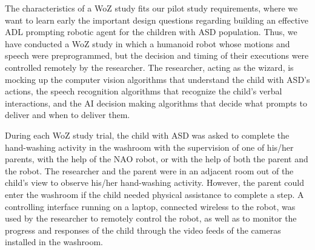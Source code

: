 \documentclass{ut-thesis}
\providecommand{\DIFaddtex}[1]{{\protect\color{blue}\uwave{#1}}} %
\providecommand{\DIFaddbegin}{} %
\providecommand{\DIFaddend}{} %
\providecommand{\DIFadd}[1]{\texorpdfstring{\DIFaddtex{#1}}{#1}} %
\begin{document}
The characteristics of a WoZ study fits our pilot study requirements, where we want to learn early the important design questions regarding building an effective ADL prompting robotic agent for the children with ASD population.  Thus, we have conducted a WoZ study in which a humanoid robot whose motions and speech were preprogrammed, but the decision and timing of their executions were controlled remotely by the researcher.  The researcher, acting as the wizard, is mocking up the computer vision algorithms that understand the child with ASD's actions, the speech recognition algorithms that recognize the child's verbal interactions, and the AI decision making algorithms that decide what prompts to deliver and when to deliver them.

During each WoZ study trial, the child with ASD was asked to complete the hand-washing activity in the washroom with the supervision of one of his/her parents, with the help of the NAO robot, or with the help of both the parent and the robot. The researcher and \DIFaddbegin \DIFadd{/ or }\DIFaddend the parent were in an adjacent room out of the child's view to observe his/her hand-washing activity.  However, the parent could enter the washroom if the child needed physical assistance to complete a step. A controlling interface running on a laptop, connected wireless to the robot, was used by the researcher to remotely control the robot, as well as to monitor the progress and responses of the child through the video feeds of the cameras installed in the washroom.
\end{document}
